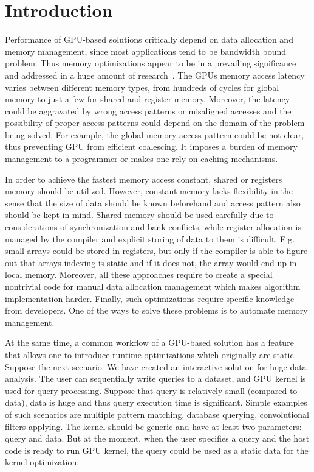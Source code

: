 \documentclass[sigplan,review,anonymous]{acmart}\settopmatter{printfolios=true,printccs=false,printacmref=false}
\begin{document}
\section{Introduction}

Performance of GPU-based solutions critically depend on data allocation and memory management, since most applications tend to be bandwidth bound problem.
Thus memory optimizations appear to be in a prevailing significance and addressed in a huge amount of research~\cite{10.1007/978-3-319-74313-4_27, Xie2018ICCADU, zhang2019efficient}.
The GPUs memory access latency varies between different memory types, from hundreds of cycles for global memory to just a few for shared and register memory.
Moreover, the latency could be aggravated by wrong access patterns or misaligned accesses and the possibility of proper access patterns could depend on the domain of the problem being solved.
For example, the global memory access pattern could be not clear, thus preventing GPU from efficient coalescing. 
It imposes a burden of memory management to a programmer or makes one rely on caching mechanisms. 

In order to achieve the fastest memory access constant, shared or registers memory should be utilized.
However, constant memory lacks flexibility in the sense that the size of data should be known beforehand and access pattern also should be kept in mind.
Shared memory should be used carefully due to considerations of synchronization and bank conflicts, while register allocation is managed by the compiler and explicit storing of data to them is difficult.
E.g. small arrays could be stored in registers, but only if the compiler is able to figure out that arrays indexing is static and if it does not, the array would end up in local memory.
Moreover, all these approaches require to create a special nontrivial code for manual data allocation management which makes algorithm implementation harder.
Finally, such optimizations require specific knowledge from developers.
One of the ways to solve these problems is to automate memory management.

At the same time, a common workflow of a GPU-based solution has a feature that allows one to introduce runtime optimizations which originally are static.
Suppose the next scenario.
We have created an interactive solution for huge data analysis.
The user can sequentially write queries to a dataset, and GPU kernel is used for query processing.
Suppose that query is relatively small (compared to data), data is huge and thus query execution time is significant.
Simple examples of such scenarios are multiple pattern matching, database querying, convolutional filters applying.
The kernel should be generic and have at least two parameters: query and data.
But at the moment, when the user specifies a query and the host code is ready to run GPU kernel, the query could be used as a static data for the kernel optimization.
\end{document}
